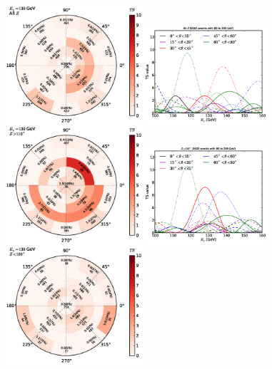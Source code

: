 \documentclass[aps,twocolumn,prd,superscriptaddress,showpacs,nofootinbib,fixfloat]{revtex4}
\begin{document}
\begin{figure}
  \centering
  \includegraphics[width=0.45\textwidth]{plots/polar_all.eps}
  \includegraphics[width=0.40\textwidth]{plots/scan_all.eps}
  \includegraphics[width=0.45\textwidth]{plots/polar_z.GT.110.eps}
  \includegraphics[width=0.40\textwidth]{plots/scan_z.GT.110.eps}
  \includegraphics[width=0.45\textwidth]{plots/polar_z.LE.100.eps}

\end{figure}
\end{document}
